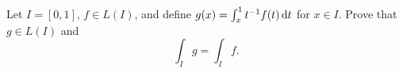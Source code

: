 \begin{problem}
  Let \(I=[0,1]\), \(f\in L(I)\), and define
  \(g(x)=\int_x^1 t^{-1}f(t) \mathop{}\!\mathrm{d} t\) for \(x\in I\). Prove that
  \(g\in L(I)\) and
  \[
    \int_I g=\int_I f.
  \]
\end{problem}
\begin{solution}
\end{solution}

